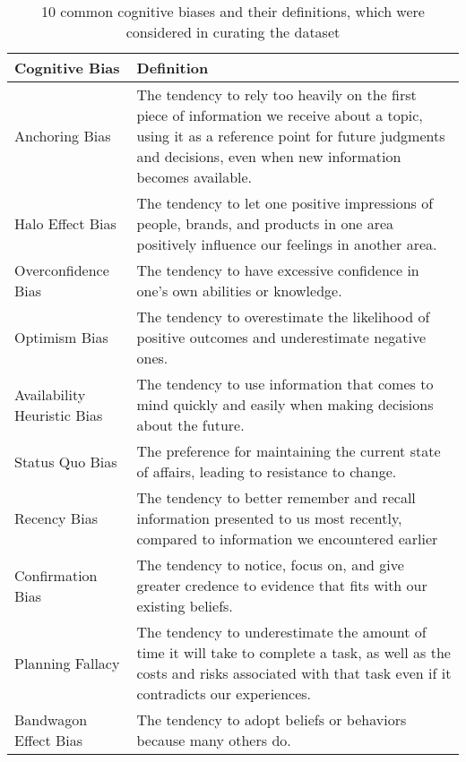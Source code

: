 \begin{table}[htbp]
    \centering
    \renewcommand{\arraystretch}{1.2}
    \begin{tabular}{m{1.5cm}|m{5.5cm}}
        \toprule
        \textbf{Cognitive Bias} & \textbf{Definition} \\
        \midrule
        Anchoring Bias & The tendency to rely too heavily on the first piece of information we receive about a topic, using it as a reference point for future judgments and decisions, even when new information becomes available. \\
        \midrule
        Halo Effect Bias & The tendency to let one positive impressions of people, brands, and products in one area positively influence our feelings in another area. \\
        \midrule
        Overconfidence Bias & The tendency to have excessive confidence in one's own abilities or knowledge. \\
        \midrule
        Optimism Bias & The tendency to overestimate the likelihood of positive outcomes and underestimate negative ones. \\
        \midrule
        Availability Heuristic Bias & The tendency to use information that comes to mind quickly and easily when making decisions about the future. \\
        \midrule
        Status Quo Bias & The preference for maintaining the current state of affairs, leading to resistance to change.  \\
        \midrule
        Recency Bias & The tendency to better remember and recall information presented to us most recently, compared to information we encountered earlier\\
        \midrule
        Confirmation Bias & The tendency to notice, focus on, and give greater credence to evidence that fits with our existing beliefs.
        \\
        \midrule
        Planning Fallacy & The tendency to underestimate the amount of time it will take to complete a task, as well as the costs and risks associated with that task even if it contradicts our experiences. \\
        \midrule
        Bandwagon Effect Bias & The tendency to adopt beliefs or behaviors because many others do. \\
        \bottomrule
    \end{tabular}
    \caption{10 common cognitive biases and their definitions, which were considered in curating the dataset}
    \label{tab:cognitive_biases}
\end{table}
